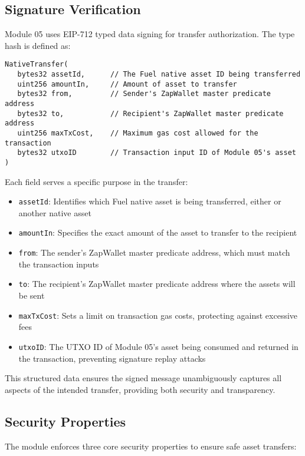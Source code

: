 
\subsection{Signature Verification}
Module 05 uses EIP-712 typed data signing for transfer authorization. The  type hash is defined as:\\

\begin{lstlisting}
NativeTransfer(
   bytes32 assetId,      // The Fuel native asset ID being transferred
   uint256 amountIn,     // Amount of asset to transfer
   bytes32 from,         // Sender's ZapWallet master predicate address
   bytes32 to,           // Recipient's ZapWallet master predicate address
   uint256 maxTxCost,    // Maximum gas cost allowed for the transaction
   bytes32 utxoID        // Transaction input ID of Module 05's asset
)
\end{lstlisting}

Each field serves a specific purpose in the transfer:
\begin{itemize}
   \item \texttt{assetId}: Identifies which Fuel native asset is being transferred, either  or another native asset
   \item \texttt{amountIn}: Specifies the exact amount of the asset to transfer to the recipient
   \item \texttt{from}: The sender's ZapWallet master predicate address, which must match the transaction inputs
   \item \texttt{to}: The recipient's ZapWallet master predicate address where the assets will be sent
   \item \texttt{maxTxCost}: Sets a limit on transaction gas costs, protecting against excessive fees
   \item \texttt{utxoID}: The UTXO ID of Module 05's asset being consumed and returned in the transaction, preventing signature replay attacks
\end{itemize}

This structured data ensures the signed message unambiguously captures all aspects of the intended transfer, providing both
security and transparency.



\subsection{Security Properties}
The module enforces three core security properties to ensure safe asset transfers:

